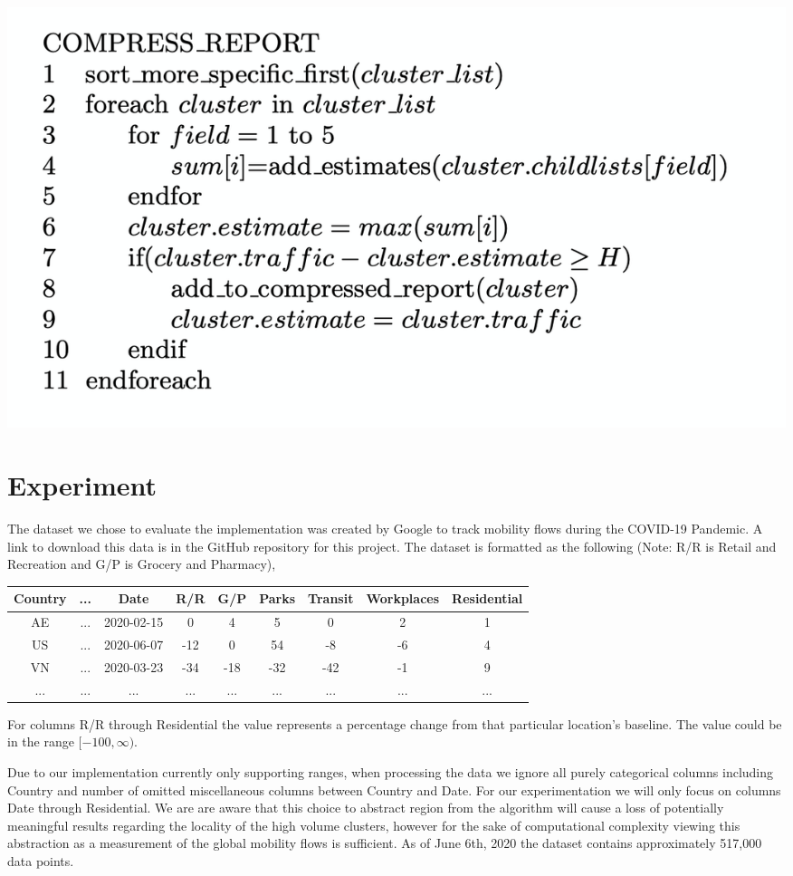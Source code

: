 \documentclass{article}
\begin{document}
\begin{center}
   \includegraphics[scale=0.5]{CompressGraph}
\end{center}

\section{Experiment}
The dataset we chose to evaluate the implementation was created by Google to track mobility flows during the COVID-19 Pandemic. A link to download this data is in the GitHub repository for this project.  The dataset is formatted as the following (Note: R/R is Retail and Recreation and G/P is Grocery and Pharmacy),

\begin{adjustbox}{width=\textwidth,totalheight=\textheight,keepaspectratio,rotate=0,caption={Data Format},nofloat=table}
\begin{tabular}{ |c|c|c|c|c|c|c|c|c| }
\hline
 Country & ... &Date&R/R&G/P&Parks&Transit&Workplaces&Residential \\ 
 \hline
 AE&...&2020-02-15&0&4&5&0&2&1 \\
 US&...&2020-06-07&-12&0&54&-8&-6&4 \\
 VN&...&2020-03-23&-34&-18&-32&-42&-1&9 \\
 ...&...&...&...&...&...&...&...&... \\
 \hline
\end{tabular}
\end{adjustbox}

\hfill

For columns R/R through Residential the value represents a percentage change from that particular location's baseline.  The value could be in the range \([-100, \infty)\).

Due to our implementation currently only supporting ranges, when processing the data we ignore all purely categorical columns including Country and number of omitted miscellaneous columns between Country and Date.  For our experimentation we will only focus on columns Date through Residential.  We are are aware that this choice to abstract region from the algorithm will cause a loss of potentially meaningful results regarding the locality of the high volume clusters, however for the sake of computational complexity viewing this abstraction as a measurement of the global mobility flows is sufficient.  As of June 6th, 2020 the dataset contains approximately 517,000 data points.
\end{document}
